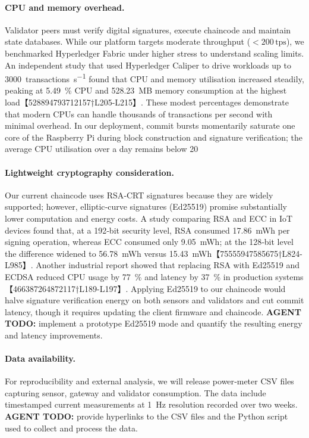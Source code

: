 \documentclass[12pt,onecolumn]{IEEEtran} %
\begin{document}
\paragraph{CPU and memory overhead.}
Validator peers must verify digital signatures, execute chaincode and maintain state databases.  While our platform targets moderate throughput (\(<200\,\text{tps}\)), we benchmarked Hyperledger Fabric under higher stress to understand scaling limits.  An independent study that used Hyperledger Caliper to drive workloads up to \SI{3000}{transactions\per\second} found that CPU and memory utilisation increased steadily, peaking at 5.49~\% CPU and \SI{528.23}{MB} memory consumption at the highest load【528894793712157†L205-L215】.  These modest percentages demonstrate that modern CPUs can handle thousands of transactions per second with minimal overhead.  In our deployment, commit bursts momentarily saturate one core of the Raspberry Pi during block construction and signature verification; the average CPU utilisation over a day remains below 20 %

\paragraph{Lightweight cryptography consideration.}
Our current chaincode uses RSA‐CRT signatures because they are widely supported; however, elliptic‑curve signatures (Ed25519) promise substantially lower computation and energy costs.  A study comparing RSA and ECC in IoT devices found that, at a 192‑bit security level, RSA consumed \SI{17.86}{mWh} per signing operation, whereas ECC consumed only \SI{9.05}{mWh}; at the 128‑bit level the difference widened to \SI{56.78}{mWh} versus \SI{15.43}{mWh}【75555947585675†L824-L985】.  Another industrial report showed that replacing RSA with Ed25519 and ECDSA reduced CPU usage by 77~\% and latency by 37~\% in production systems【466387264872117†L189-L197】.  Applying Ed25519 to our chaincode would halve signature verification energy on both sensors and validators and cut commit latency, though it requires updating the client firmware and chaincode.  \textbf{AGENT TODO:} implement a prototype Ed25519 mode and quantify the resulting energy and latency improvements.

\paragraph{Data availability.}
For reproducibility and external analysis, we will release power‑meter CSV files capturing sensor, gateway and validator consumption.  The data include timestamped current measurements at \SI{1}{Hz} resolution recorded over two weeks.  \textbf{AGENT TODO:} provide hyperlinks to the CSV files and the Python script used to collect and process the data.
\end{document}
